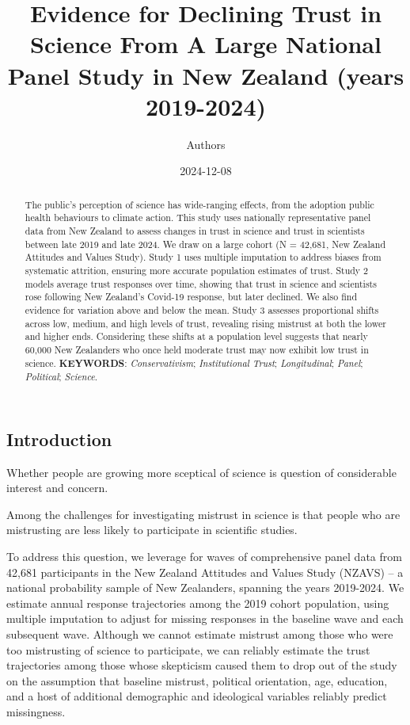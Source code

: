 \documentclass[
  single column]{article}
\title{Evidence for Declining Trust in Science From A Large National
Panel Study in New Zealand (years 2019-2024)}
\author{Authors}
\affil{%
             \small{     New Zealand
          ORCID \textcolor[HTML]{A6CE39}{\aiOrcid} ~0000-0003-3169-6576 }
              }
\date{2024-12-08}
\begin{document}
\maketitle
\begin{abstract}
The public's perception of science has wide-ranging effects, from the
adoption public health behaviours to climate action. This study uses
nationally representative panel data from New Zealand to assess changes
in trust in science and trust in scientists between late 2019 and late
2024. We draw on a large cohort (N = 42,681, New Zealand Attitudes and
Values Study). Study 1 uses multiple imputation to address biases from
systematic attrition, ensuring more accurate population estimates of
trust. Study 2 models average trust responses over time, showing that
trust in science and scientists rose following New Zealand's Covid-19
response, but later declined. We also find evidence for variation above
and below the mean. Study 3 assesses proportional shifts across low,
medium, and high levels of trust, revealing rising mistrust at both the
lower and higher ends. Considering these shifts at a population level
suggests that nearly 60,000 New Zealanders who once held moderate trust
may now exhibit low trust in science. \textbf{KEYWORDS}:
\emph{Conservativism}; \emph{Institutional Trust}; \emph{Longitudinal};
\emph{Panel}; \emph{Political}; \emph{Science}.
\end{abstract}


\subsection{Introduction}\label{introduction}

Whether people are growing more sceptical of science is question of
considerable interest and concern.

Among the challenges for investigating mistrust in science is that
people who are mistrusting are less likely to participate in scientific
studies.

To address this question, we leverage for waves of comprehensive panel
data from 42,681 participants in the New Zealand Attitudes and Values
Study (NZAVS) -- a national probability sample of New Zealanders,
spanning the years 2019-2024. We estimate annual response trajectories
among the 2019 cohort population, using multiple imputation to adjust
for missing responses in the baseline wave and each subsequent wave.
Although we cannot estimate mistrust among those who were too
mistrusting of science to participate, we can reliably estimate the
trust trajectories among those whose skepticism caused them to drop out
of the study on the assumption that baseline mistrust, political
orientation, age, education, and a host of additional demographic and
ideological variables reliably predict missingness.
\end{document}
